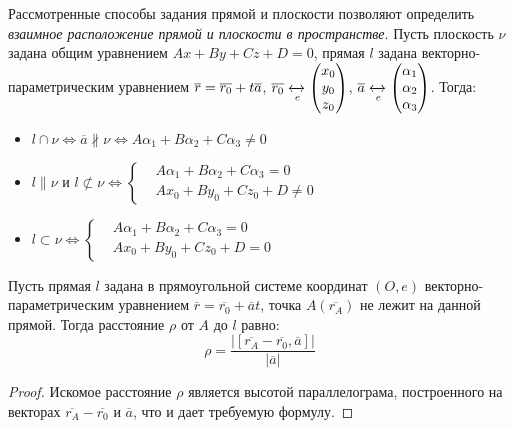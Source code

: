 \begin{note}
	Рассмотренные способы задания прямой и плоскости позволяют определить \textit{взаимное расположение прямой и плоскости в пространстве}. Пусть плоскость $\nu$ задана общим уравнением $Ax + By + Cz + D = 0$, прямая $l$ задана векторно-параметрическим уравнением $\overline{r} \hm{=} \overline{r_0} + t\overline{a}$, $\overline{r_0} \xleftrightarrow[e]{} \begin{pmatrix}
	x_0\\y_0\\z_0\end{pmatrix}$, $\overline{a} \xleftrightarrow[e]{} \begin{pmatrix}
	\alpha_1\\\alpha_2\\\alpha_3\end{pmatrix}$. Тогда:
	\begin{itemize}
		\item $l \cap \nu \Leftrightarrow \overline{a} \nparallel \nu \Leftrightarrow A\alpha_1 + B\alpha_2 + C\alpha_3 \ne 0$
		\item $l \parallel \nu \text{ и } l \not\subset \nu \Leftrightarrow
		\left\{\begin{aligned}
		&A\alpha_1 + B\alpha_2 + C\alpha_3 = 0\\
		&Ax_0 + By_0 + Cz_0 + D \ne 0
		\end{aligned}\right.$
		\item $l \subset \nu \Leftrightarrow
		\left\{\begin{aligned}
		&A\alpha_1 + B\alpha_2 + C\alpha_3 = 0\\
		&Ax_0 + By_0 + Cz_0 + D = 0
		\end{aligned}\right.$
	\end{itemize}
\end{note}

\begin{proposition}
	Пусть прямая $l$ задана в прямоугольной системе координат $(O, e)$ векторно-параметрическим уравнением $\overline{r} = \overline{r_0} + \overline{a}t$, точка $A(\overline{r_A})$ не лежит на данной прямой. Тогда расстояние $\rho$ от $A$ до $l$ равно:
	\[\rho = \frac{|[\overline{r_A} - \overline{r_0}, \overline{a}]|}{|\overline{a}|}\]
\end{proposition}

\begin{proof}
	Искомое расстояние $\rho$ является высотой параллелограма, построенного на векторах $\overline{r_A} - \overline{r_0}$ и $\overline{a}$, что и дает требуемую формулу.
\end{proof}

